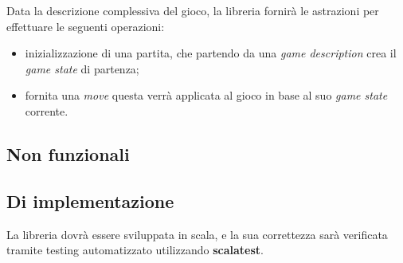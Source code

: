 Data la descrizione complessiva del gioco, la libreria fornirà le astrazioni per effettuare le seguenti operazioni:

\begin{itemize}
    \item inizializzazione di una partita, che partendo da una \textit{game description} crea il \textit{game state} di partenza;
    \item fornita una \textit{move} questa verrà applicata al gioco in base al suo \textit{game state} corrente.
\end{itemize}

\subsection{Non funzionali}



\subsection{Di implementazione}

La libreria dovrà essere sviluppata in scala, e la sua correttezza sarà verificata tramite testing automatizzato utilizzando \textbf{scalatest}.